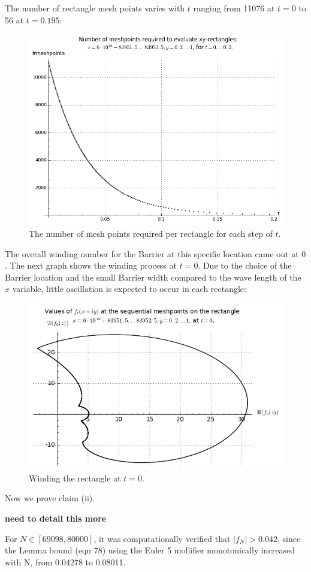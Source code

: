The number of rectangle mesh points varies with $t$ ranging from 11076 at $t=0$ to 56 at $t=0.195$:

\begin{figure}[h!]
  \includegraphics[width=0.7\linewidth]{Numberofmeshpoints}
  \caption{The number of mesh points required per rectangle for each step of $t$.}
\end{figure}

The overall winding number for the Barrier at this specific location came out at $0$. The next graph shows the winding process at $t=0$. Due to the choice of the Barrier location and the small Barrier width compared to the wave length of the $x$ variable, little oscillation is expected to occur in each rectangle:

\begin{figure}[h!]
  \includegraphics[width=0.7\linewidth]{Windingprocess}
  \caption{Winding the rectangle at $t=0$.}
\end{figure}

Now we prove claim (ii).

{\bf need to detail this more}

For $N \in [69098,80000]$, it was computationally verified that $|f_{N}| > 0.042$, since the Lemma bound (eqn 78) using the Euler 5 mollifier monotonically increased with N, from 0.04278 to 0.08011.

